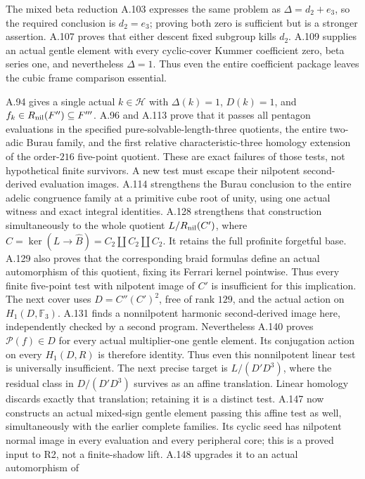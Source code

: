 The mixed beta reduction A.103 expresses the same problem as
$\Delta=d_2+e_3$, so the required conclusion is $d_2=e_3$;
proving both zero is sufficient but is a stronger assertion.
A.107 proves that either descent fixed subgroup kills $d_2$.
A.109 supplies an actual gentle element with every cyclic-cover
Kummer coefficient zero, beta series one, and nevertheless
$\Delta=1$. Thus even the entire coefficient package leaves
the cubic frame comparison essential.

A.94 gives a single actual $k\in\mathcal H$ with
$\Delta(k)=1$, $D(k)=1$, and
$f_k\in R_{\rm nil}(F'')\subseteq F'''$.
A.96 and A.113 prove that it passes all pentagon evaluations
in the specified pure-solvable-length-three quotients, the
entire two-adic Burau family, and the first relative
characteristic-three homology extension of the order-$216$
five-point quotient. These are exact failures of those tests,
not hypothetical finite survivors. A new test must escape
their nilpotent second-derived evaluation images.
A.114 strengthens the Burau conclusion to the entire adelic
congruence family at a primitive cube root of unity, using
one actual witness and exact integral identities.
A.128 strengthens that construction simultaneously to the
whole quotient $L/R_{\rm nil}(C')$, where
$C=\ker(L\to\widehat B)=C_2\amalg C_2\amalg C_2$.
It retains the full profinite forgetful base. A.129 also proves
that the corresponding braid formulas define an actual
automorphism of this quotient, fixing its Ferrari kernel
pointwise. Thus every finite five-point test with nilpotent
image of $C'$ is insufficient for this implication.
The next cover uses $D=C''(C')^2$, free of rank $129$, and
the actual action on $H_1(D,\mathbb F_3)$. A.131 finds a
nonnilpotent harmonic second-derived image here, independently
checked by a second program. Nevertheless A.140 proves
$\mathcal P(f)\in D$ for every actual multiplier-one gentle
element. Its conjugation action on every $H_1(D,R)$ is
therefore identity. Thus even this nonnilpotent linear test
is universally insufficient. The next precise target is
$L/(D'D^3)$, where the residual class in $D/(D'D^3)$
survives as an affine translation. Linear homology discards
exactly that translation; retaining it is a distinct test.
A.147 now constructs an actual mixed-sign gentle element
passing this affine test as well, simultaneously with the
earlier complete families. Its cyclic seed has nilpotent
normal image in every evaluation and every peripheral core;
this is a proved input to R2, not a finite-shadow lift.
A.148 upgrades it to an actual automorphism of
